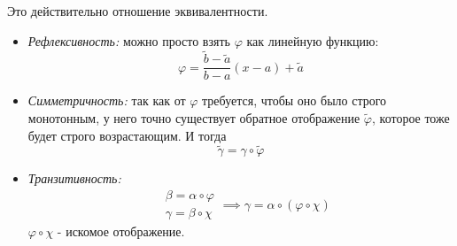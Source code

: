 \documentclass[../main.tex]{subfiles}
\begin{document}
\begin{note}
    Это действительно отношение эквивалентности.
    \begin{itemize}
        \item \emph{Рефлексивность:} можно просто взять \( \varphi \) как линейную функцию:
        \[ \varphi = \dfrac{ \tilde{b}-\tilde{a}}{ b-a}\left( x-a\right)+ \tilde{a}\]
        \item \emph{Симметричность:} так как от \( \varphi \) требуется, чтобы оно было строго монотонным, у него точно существует обратное отображение \( \tilde{ \varphi }\), которое тоже будет строго возрастающим. И тогда 
        \[ \tilde{ \gamma }= \gamma \circ \tilde{ \varphi }\]
        \item \emph{Транзитивность:}
        \begin{equation*}
            \begin{aligned}
                &\beta = \alpha \circ \varphi\\
                &\gamma = \beta \circ \chi
            \end{aligned}
            \implies \gamma = \alpha \circ \left( \varphi \circ \chi\right)
        \end{equation*}
        \( \varphi \circ \chi \) - искомое отображение. 
    \end{itemize}
\end{note}
\end{document}
